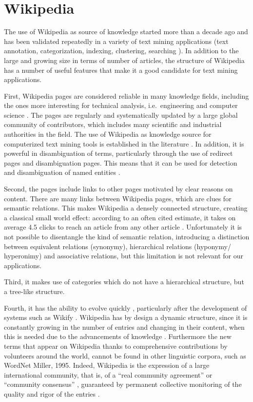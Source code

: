\documentclass[]{book}
\theoremstyle{definition}
\theoremstyle{definition}
\theoremstyle{definition}
\theoremstyle{remark}
\begin{document}
\section{Wikipedia}\label{sotadocumentswiki}

The use of Wikipedia as source of knowledge started more than a decade
ago and has been validated repeatedly in a variety of text mining
applications (text annotation, categorization, indexing, clustering,
searching \citep{milne2008learning}). In addition to the large and
growing size in terms of number of articles, the structure of Wikipedia
has a number of useful features that make it a good candidate for text
mining applications.

First, Wikipedia pages are considered reliable in many knowledge fields,
including the ones more interesting for technical analysis,
i.e.~engineering and computer science \citep{xu2015improving}. The pages
are regularly and systematically updated by a large global community of
contributors, which includes many scientific and industrial authorities
in the field. The use of Wikipedia as knowledge source for computerized
text mining tools is established in the literature
\citep{ferragina2012fast}. In addition, it is powerful in disambiguation
of terms, particularly through the use of redirect pages and
disambiguation pages. This means that it can be used for detection and
disambiguation of named entities \citep{bunescu2006using}.

Second, the pages include links to other pages motivated by clear
reasons on content. There are many links between Wikipedia pages, which
are clues for semantic relations. This makes Wikipedia a densely
connected structure, creating a classical small world effect: according
to an often cited estimate, it takes on average 4.5 clicks to reach an
article from any other article \citep{dolan2008six}. Unfortunately it is
not possible to disentangle the kind of semantic relation, introducing a
distinction between equivalent relations (synonymy), hierarchical
relations (hyponymy/ hyperonimy) and associative relations, but this
limitation is not relevant for our applications.

Third, it makes use of categories which do not have a hierarchical
structure, but a tree-like structure.

Fourth, it has the ability to evolve quickly \citep{lih2004wikipedia},
particularly after the development of systems such as Wikify
\citep{mihalcea2007wikify, cheng2013relational}. Wikipedia has by design
a dynamic structure, since it is constantly growing in the number of
entries and changing in their content, when this is needed due to the
advancements of knowledge \citep{ponzetto2007knowledge}. Furthermore the
new terms that appear on Wikipedia thanks to comprehensive contributions
by volunteers around the world, cannot be found in other linguistic
corpora, such as WordNet Miller, 1995. Indeed, Wikipedia is the
expression of a large international community, that is, of a ``real
community agreement'' \citep{bizer2009dbpedia} or ``community
consensus'' \citep{hepp2007harvesting}, guaranteed by permanent
collective monitoring of the quality and rigor of the entries
\citep{bryant2005becoming}.
\end{document}
